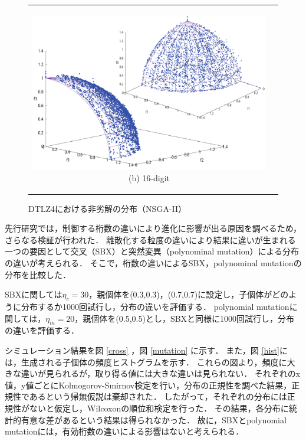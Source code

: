 \documentclass[../main/main]{subfiles}
\begin{document}
\begin{description}
\begin{figure}[!hb]
\begin{tabular}{cc}
\begin{minipage}{0.32\hsize}
\label{non_b}
\end{minipage}
\begin{minipage}{0.32\hsize}
\includegraphics[width=1\linewidth]{../figures/DTLZ4_double_another.pdf}
\centering
{\footnotesize (b) 16-digit}
\caption{DTLZ4における非劣解の分布（NSGA-II）}
\label{non_c}
\end{minipage}
\end{tabular}
\end{figure}

%
\afterpage{\clearpage}

%
\quad 先行研究では，制御する桁数の違いにより進化に影響が出る原因を調べるため，さらなる検証が行われた．
離散化する粒度の違いにより結果に違いが生まれる一つの要因として交叉（SBX）と突然変異（polynominal mutation）による分布の違いが考えられる．
そこで，桁数の違いによるSBX，polynominal mutationの分布を比較した．

\quad SBXに関しては$\eta_c=30$，親個体を(0.3,0.3)，(0.7,0.7)に設定し，子個体がどのように分布するか1000回試行し，分布の違いを評価する．
polynomial mutationに関しては，$\eta_m=20$，親個体を(0.5,0.5)とし，SBXと同様に1000回試行し，分布の違いを評価する．

\quad シミュレーション結果を図  \ref{cross}  ，図  \ref{mutation} に示す．
また，図 \ref{hist}には，生成される子個体の頻度ヒストグラムを示す．
これらの図より，頻度に大きな違いが見られるが，取り得る値には大きな違いは見られない．
それぞれのx値，y値ごとにKolmogorov-Smirnov検定を行い，分布の正規性を調べた結果，正規性であるという帰無仮説は棄却された．
したがって，それぞれの分布には正規性がないと仮定し，Wilcoxonの順位和検定を行った．
その結果，各分布に統計的有意な差があるという結果は得られなかった．
故に，SBXとpolynomial mutationには，有効桁数の違いによる影響はないと考えられる．


\end{description}
\end{document}
